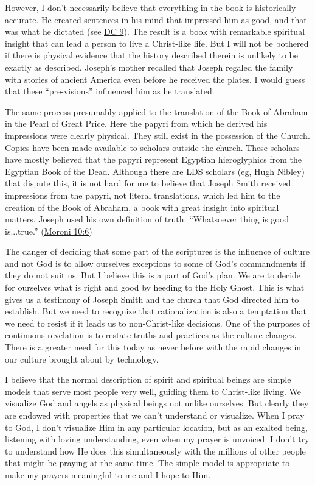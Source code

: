 			However, I don't necessarily believe that everything in the book is historically accurate. He created sentences in his mind that impressed him as good, and that was what he dictated (see \hyperref[DC9]{DC 9}). The result is a book with remarkable spiritual insight that can lead a person to live a Christ-like life. But I will not be bothered if there is physical evidence that the history described therein is unlikely to be exactly as described. Joseph's mother recalled that Joseph regaled the family with stories of ancient America even before he received the plates. I would guess that these ``pre-visions'' influenced him as he translated.

			The same process presumably applied to the translation of the Book of Abraham in the Pearl of Great Price. Here the papyri from which he derived his impressions were clearly physical. They still exist in the possession of the Church. Copies have been made available to scholars outside the church. These scholars have mostly believed that the papyri represent Egyptian hieroglyphics from the Egyptian Book of the Dead. Although there are LDS scholars (eg, Hugh Nibley) that dispute this, it is not hard for me to believe that Joseph Smith received impressions from the papyri, not literal translations, which led him to the creation of the Book of Abraham, a book with great insight into spiritual matters. Joseph used his own definition of truth: ``Whatsoever thing is good is...true.'' (\hyperref[MORONI-10-6]{Moroni 10:6})

			The danger of deciding that some part of the scriptures is the influence of culture and not God is to allow ourselves exceptions to some of God's commandments if they do not suit us. But I believe this is a part of God's plan. We are to decide for ourselves what is right and good by heeding to the Holy Ghost. This is what gives us a testimony of Joseph Smith and the church that God directed him to establish. But we need to recognize that rationalization is also a temptation that we need to resist if it leads us to non-Christ-like decisions. One of the purposes of continuous revelation is to restate truths and practices as the culture changes. There is a greater need for this today as never before with the rapid changes in our culture brought about by technology.

			I believe that the normal description of spirit and spiritual beings are simple models that serve most people very well, guiding them to Christ-like living. We visualize God and angels as physical beings not unlike ourselves. But clearly they are endowed with properties that we can't understand or visualize. When I pray to God, I don't visualize Him in any particular location, but as an exalted being, listening with loving understanding, even when my prayer is unvoiced. I don't try to understand how He does this simultaneously with the millions of other people that might be praying at the same time. The simple model is appropriate to make my prayers meaningful to me and I hope to Him.

